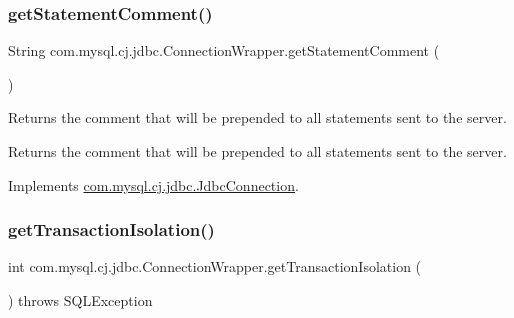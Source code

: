 \subsubsection{\texorpdfstring{get\+Statement\+Comment()}{getStatementComment()}}
{\footnotesize\ttfamily String com.\+mysql.\+cj.\+jdbc.\+Connection\+Wrapper.\+get\+Statement\+Comment (\begin{DoxyParamCaption}{ }\end{DoxyParamCaption})}

Returns the comment that will be prepended to all statements sent to the server.

\begin{DoxyReturn}{Returns}
the comment that will be prepended to all statements sent to the server. 
\end{DoxyReturn}


Implements \mbox{\hyperlink{interfacecom_1_1mysql_1_1cj_1_1jdbc_1_1_jdbc_connection_a11233536b54479183feb8eda938f72e9}{com.\+mysql.\+cj.\+jdbc.\+Jdbc\+Connection}}.

\mbox{\label{classcom_1_1mysql_1_1cj_1_1jdbc_1_1_connection_wrapper_a5a460da4650ce588704afa3bc76f20e0}} 
\subsubsection{\texorpdfstring{get\+Transaction\+Isolation()}{getTransactionIsolation()}}
{\footnotesize\ttfamily int com.\+mysql.\+cj.\+jdbc.\+Connection\+Wrapper.\+get\+Transaction\+Isolation (\begin{DoxyParamCaption}{ }\end{DoxyParamCaption}) throws S\+Q\+L\+Exception}

\mbox{\label{classcom_1_1mysql_1_1cj_1_1jdbc_1_1_connection_wrapper_a5937fe77552189bdc479b80bc84bf5df}} 
